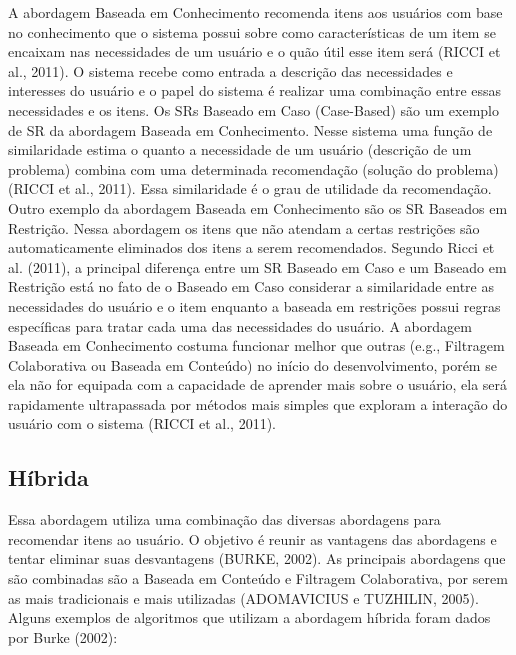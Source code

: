 A abordagem Baseada em Conhecimento recomenda itens aos usuários com base no conhecimento que o sistema possui sobre como características de um item se encaixam nas necessidades de um usuário e o quão útil esse item será (RICCI et al., 2011). O sistema recebe como entrada a descrição das necessidades e interesses do usuário e o papel do sistema é realizar uma combinação entre essas necessidades e os itens.
Os SRs Baseado em Caso (Case-Based) são um exemplo de SR da abordagem Baseada em Conhecimento. Nesse sistema uma função de similaridade estima o quanto a necessidade de um usuário (descrição de um problema) combina com uma determinada recomendação (solução do problema) (RICCI et al., 2011). Essa similaridade é o grau de utilidade da recomendação.
Outro exemplo da abordagem Baseada em Conhecimento são os SR Baseados em Restrição. Nessa abordagem os itens que não atendam a certas restrições são automaticamente eliminados dos itens a serem recomendados. Segundo Ricci et al. (2011), a principal diferença entre um SR Baseado em Caso e um Baseado em Restrição está no fato de o Baseado em Caso considerar a similaridade entre as necessidades do usuário e o item enquanto a baseada em restrições possui regras específicas para tratar cada uma das necessidades do usuário.
A abordagem Baseada em Conhecimento costuma funcionar melhor que outras (e.g., Filtragem Colaborativa ou Baseada em Conteúdo) no início do desenvolvimento, porém se ela não for equipada com a capacidade de aprender mais sobre o usuário, ela será rapidamente ultrapassada por métodos mais simples que exploram a interação do usuário com o sistema (RICCI et al., 2011).

\subsection{Híbrida}

Essa abordagem utiliza uma combinação das diversas abordagens para recomendar itens ao usuário. O objetivo é reunir as vantagens das abordagens e tentar eliminar suas desvantagens (BURKE, 2002). As principais abordagens que são combinadas são a Baseada em Conteúdo e Filtragem Colaborativa, por serem as mais tradicionais e mais utilizadas (ADOMAVICIUS e TUZHILIN, 2005). Alguns exemplos de algoritmos que utilizam a abordagem híbrida foram dados por Burke (2002):

